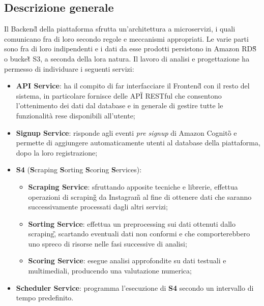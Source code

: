 \subsection{Descrizione generale}
Il Backend\G{} della piattaforma sfrutta un'architettura a microservizi, i quali comunicano fra di loro secondo regole e meccanismi appropriati.
Le varie parti sono fra di loro indipendenti e i dati da esse prodotti persistono in Amazon RDS\G{} o bucket\G{} S3, a seconda della lora natura.
Il lavoro di analisi e progettazione ha permesso di individuare i seguenti servizi:
\begin{itemize}
    \item \textbf{API Service}: ha il compito di far interfacciare il Frontend\G{} con il resto del sistema, in particolare fornisce
    delle API\G{} RESTful che consentono l'ottenimento dei dati dal database e in generale di gestire tutte le funzionalità rese disponibili all'utente;
    \item \textbf{Signup Service}: risponde agli eventi \textit{pre signup} di Amazon Cognito\G{} e permette di aggiungere automaticamente utenti al database della piattaforma, dopo la loro registrazione;
    \item \textbf{S4} (\textbf{S}craping \textbf{S}orting \textbf{S}coring \textbf{S}ervices):
        \begin{itemize}
            \item \textbf{Scraping Service}: sfruttando apposite tecniche e librerie, effettua operazioni di scraping\G{} da Instagram\G{} al fine di ottenere dati che
            saranno successivamente processati dagli altri servizi;
            \item \textbf{Sorting Service}: effettua un preprocessing sui dati ottenuti dallo scraping\G, scartando eventuali dati non conformi e che comporterebbero
            uno spreco di risorse nelle fasi successive di analisi;
            \item \textbf{Scoring Service}: esegue analisi approfondite su dati testuali e multimediali, producendo una valutazione numerica; 
        \end{itemize}
    \item \textbf{Scheduler Service}: programma l'esecuzione di \textbf{S4} secondo un intervallo di tempo predefinito.
\end{itemize}


